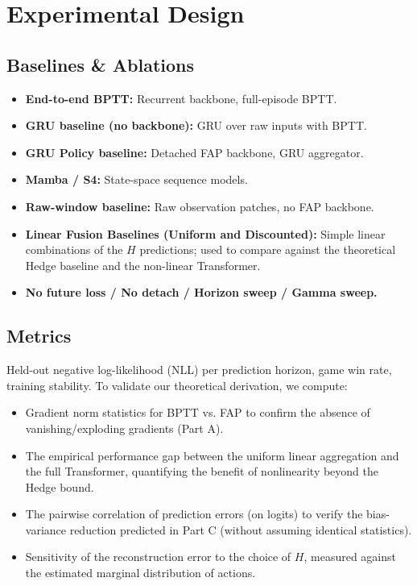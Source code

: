 \documentclass[11pt]{article}
\begin{document}
\section{Experimental Design}
\label{sec:experiments}

\subsection{Baselines \& Ablations}
\begin{itemize}
    \item \textbf{End-to-end BPTT:} Recurrent backbone, full-episode BPTT.
    \item \textbf{GRU baseline (no backbone):} GRU over raw inputs with BPTT.
    \item \textbf{GRU Policy baseline:} Detached FAP backbone, GRU aggregator.
    \item \textbf{Mamba / S4:} State-space sequence models.
    \item \textbf{Raw-window baseline:} Raw observation patches, no FAP backbone.
    \item \textbf{Linear Fusion Baselines (Uniform and Discounted):} Simple linear combinations of the \(H\) predictions; used to compare against the theoretical Hedge baseline and the non-linear Transformer.
    \item \textbf{No future loss / No detach / Horizon sweep / Gamma sweep.}
\end{itemize}

\subsection{Metrics}
Held-out negative log-likelihood (NLL) per prediction horizon, game win rate, training stability. To validate our theoretical derivation, we compute:
\begin{itemize}
    \item Gradient norm statistics for BPTT vs. FAP to confirm the absence of vanishing/exploding gradients (Part A).
    \item The empirical performance gap between the uniform linear aggregation and the full Transformer, quantifying the benefit of nonlinearity beyond the Hedge bound.
    \item The pairwise correlation of prediction errors (on logits) to verify the bias-variance reduction predicted in Part C (without assuming identical statistics).
    \item Sensitivity of the reconstruction error to the choice of \(H\), measured against the estimated marginal distribution of actions.
\end{itemize}
\end{document}
